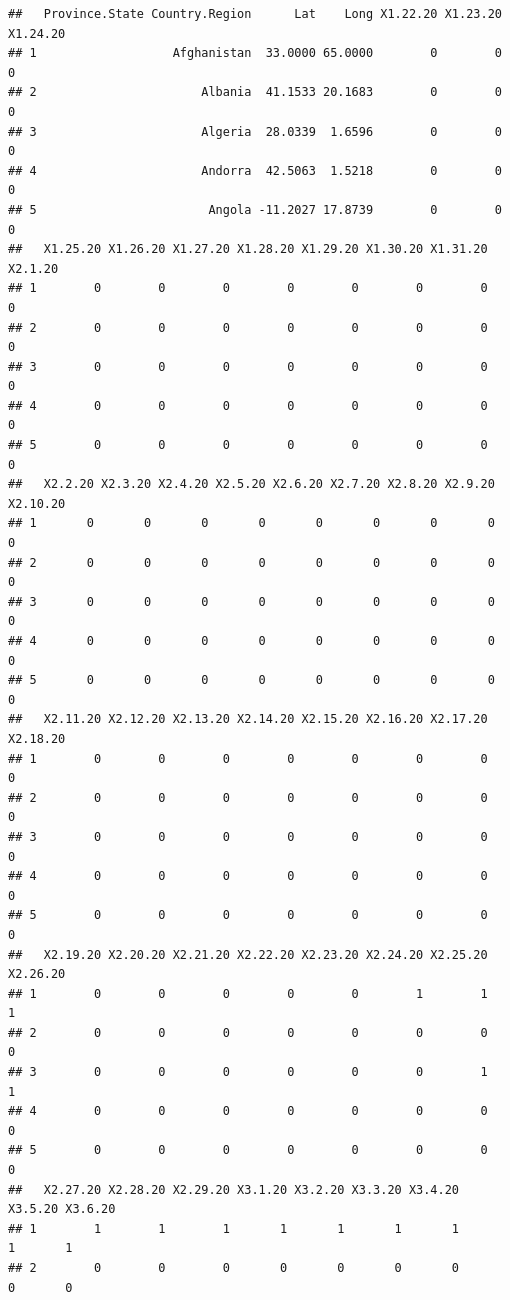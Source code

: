 \documentclass[]{article}
\begin{document}
\begin{verbatim}
##   Province.State Country.Region      Lat    Long X1.22.20 X1.23.20 X1.24.20
## 1                   Afghanistan  33.0000 65.0000        0        0        0
## 2                       Albania  41.1533 20.1683        0        0        0
## 3                       Algeria  28.0339  1.6596        0        0        0
## 4                       Andorra  42.5063  1.5218        0        0        0
## 5                        Angola -11.2027 17.8739        0        0        0
##   X1.25.20 X1.26.20 X1.27.20 X1.28.20 X1.29.20 X1.30.20 X1.31.20 X2.1.20
## 1        0        0        0        0        0        0        0       0
## 2        0        0        0        0        0        0        0       0
## 3        0        0        0        0        0        0        0       0
## 4        0        0        0        0        0        0        0       0
## 5        0        0        0        0        0        0        0       0
##   X2.2.20 X2.3.20 X2.4.20 X2.5.20 X2.6.20 X2.7.20 X2.8.20 X2.9.20 X2.10.20
## 1       0       0       0       0       0       0       0       0        0
## 2       0       0       0       0       0       0       0       0        0
## 3       0       0       0       0       0       0       0       0        0
## 4       0       0       0       0       0       0       0       0        0
## 5       0       0       0       0       0       0       0       0        0
##   X2.11.20 X2.12.20 X2.13.20 X2.14.20 X2.15.20 X2.16.20 X2.17.20 X2.18.20
## 1        0        0        0        0        0        0        0        0
## 2        0        0        0        0        0        0        0        0
## 3        0        0        0        0        0        0        0        0
## 4        0        0        0        0        0        0        0        0
## 5        0        0        0        0        0        0        0        0
##   X2.19.20 X2.20.20 X2.21.20 X2.22.20 X2.23.20 X2.24.20 X2.25.20 X2.26.20
## 1        0        0        0        0        0        1        1        1
## 2        0        0        0        0        0        0        0        0
## 3        0        0        0        0        0        0        1        1
## 4        0        0        0        0        0        0        0        0
## 5        0        0        0        0        0        0        0        0
##   X2.27.20 X2.28.20 X2.29.20 X3.1.20 X3.2.20 X3.3.20 X3.4.20 X3.5.20 X3.6.20
## 1        1        1        1       1       1       1       1       1       1
## 2        0        0        0       0       0       0       0       0       0

\end{verbatim}
\end{document}
